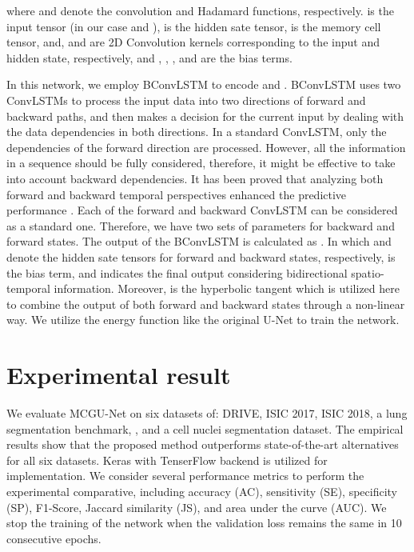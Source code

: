 \documentclass[journal]{IEEEtran}
\begin{document}
\noindent where  and  denote the convolution and Hadamard functions, respectively.  is the input tensor (in our case  and ),  is the hidden sate tensor,  is the memory cell tensor, and,  and  are 2D Convolution kernels corresponding to the input and hidden state, respectively, and , , , and  are the bias terms.





In this network, we employ BConvLSTM \cite{song2018pyramid} to encode  and . BConvLSTM uses two ConvLSTMs to process the input data into two directions of forward and backward paths, and then makes a decision for the current input by dealing with the data dependencies in both directions. In a standard ConvLSTM, only the dependencies of the forward direction are processed. However, all the information in a sequence should be fully considered, therefore, it might be effective to take into account backward dependencies. 
It has been proved that analyzing both forward and backward temporal perspectives enhanced the predictive performance \cite{cui2018deep}.
Each of the forward and backward ConvLSTM can be considered as a standard one. Therefore, we have two sets of parameters for backward and forward states. 
The output of the BConvLSTM is calculated as . 
In which  and  denote the hidden sate tensors for forward and backward states, respectively,  is the bias term, and  indicates the final output considering bidirectional spatio-temporal information. Moreover,  is the hyperbolic tangent which is utilized here to combine the output of both forward and backward states through a non-linear way. We utilize the energy function like the original U-Net to train the network. 














\section{Experimental result}
We evaluate MCGU-Net on six datasets of: DRIVE, ISIC 2017, ISIC 2018, a lung segmentation benchmark, , and a cell nuclei segmentation dataset. The empirical results show that the proposed method outperforms state-of-the-art alternatives for all six datasets. Keras with TenserFlow backend is utilized for implementation. We consider several performance metrics to perform the experimental comparative, including accuracy (AC), sensitivity (SE), specificity (SP), F1-Score, Jaccard similarity (JS), and area under the curve (AUC). We stop the training of the network when the validation loss remains the same in 10 consecutive epochs.
\end{document}
